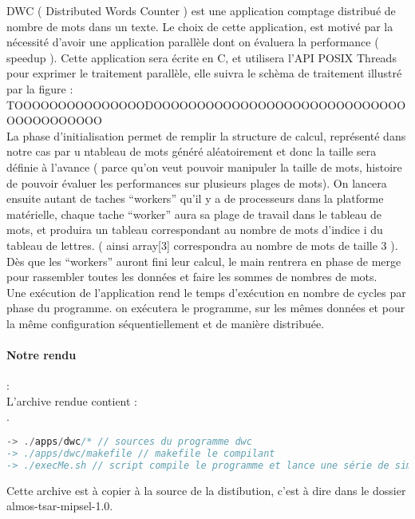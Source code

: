 DWC ( Distributed Words Counter ) est une application comptage distribué de nombre de mots dans un texte. Le choix de cette application, est motivé par la nécessité d'avoir une application parallèle dont on évaluera la performance ( speedup ). Cette application sera écrite en C, et utilisera l'API POSIX Threads pour exprimer le traitement parallèle, elle suivra le schèma de traitement illustré par la figure :\\
TOOOOOOOOOOOOOOODOOOOOOOOOOOOOOOOOOOOOOOOOOOOOOOOOOOOOOOO\\
La phase d'initialisation permet de remplir la structure de calcul, représenté dans notre cas par u ntableau de mots généré aléatoirement et donc la taille sera définie à l'avance ( parce qu'on veut pouvoir manipuler la taille de mots, histoire de pouvoir évaluer les performances sur plusieurs plages de mots). On lancera ensuite autant de taches ``workers'' qu'il y a de processeurs dans la platforme matérielle, chaque tache ``worker'' aura sa plage de travail dans le tableau de mots, et produira un tableau correspondant au nombre de mots d'indice i du tableau de lettres. ( ainsi array[3] correspondra au nombre de mots de taille 3 ). Dès que les ``workers'' auront fini leur calcul, le main rentrera en phase de merge pour rassembler toutes les données et faire les sommes de nombres de mots.\\

Une exécution de l'application rend le temps d'exécution en nombre de cycles par phase du programme. on exécutera le programme, sur les mêmes données et pour la même configuration séquentiellement et de manière distribuée.\\

\paragraph{Notre rendu}:\\

L'archive rendue contient :\\
.\\
\begin{DDbox}{\linewidth}
\begin{lstlisting}[language=C]
-> ./apps/dwc/* // sources du programme dwc
-> ./apps/dwc/makefile // makefile le compilant
-> ./execMe.sh // script compile le programme et lance une série de simulations qu on decrite dans le paragraphe precedant
\end{lstlisting}
\end{DDbox}
Cette archive est à copier à la source de la distibution, c'est à dire dans le dossier almos-tsar-mipsel-1.0.
